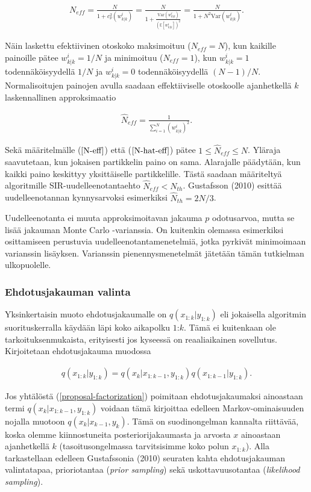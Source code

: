 \documentclass[
  12pt,
  a4paper, twoside]{book}
\begin{document}
\begin{align}\label{N-eff}
N_{eff}= \frac{N}{1+c_\nu^2(w^i_{k|k})} = \frac{N}{1+\frac{\text{Var}(w^i_{k|k})}{(\mathbb{E}[w^i_{k|k}])^2}} =\frac{N}{1+N^2\text{Var}(w^i_{k|k})}.
\end{align}

Näin laskettu efektiivinen otoskoko maksimoituu (\(N_{eff}=N\)), kun kaikille painoille pätee \(w^i_{k|k}=1/N\) ja minimoituu (\(N_{eff}=1\)), kun \(w^i_{k|k}=1\) todennäköisyydellä \(1/N\) ja \(w^i_{k|k}=0\) todennäköisyydellä \((N-1)/N\). Normalisoitujen painojen avulla saadaan effektiiviselle otoskoolle ajanhetkellä \(k\) laskennallinen approksimaatio

\begin{align}\label{N-hat-eff}
\hat{N}_{eff}=\frac{1}{\sum_{i=1}^N(w^i_{k|k})^2}.
\end{align}

Sekä määritelmälle (\(\ref{N-eff}\)) että (\(\ref{N-hat-eff}\)) pätee \(1 \leq \hat{N}_{eff} \leq N\). Yläraja saavutetaan, kun jokaisen partikkelin paino on sama. Alarajalle päädytään, kun kaikki paino keskittyy yksittäiselle partikkelille. Tästä saadaan määriteltyä algoritmille SIR-uudelleenotantaehto \(\hat{N}_{eff}< N_{th}\). Gustafsson (2010) \citep{gustafsson-2010} esittää uudelleenotannan kynnysarvoksi esimerkiksi \(\hat{N}_{th}=2N/3\).

Uudelleenotanta ei muuta approksimoitavan jakauma \(p\) odotusarvoa, mutta se lisää jakauman Monte Carlo -varianssia. On kuitenkin olemassa esimerkiksi osittamiseen perustuvia uudelleenotantamenetelmiä, jotka pyrkivät minimoimaan varianssin lisäyksen. Varianssin pienennysmenetelmät jätetään tämän tutkielman ulkopuolelle.

\subsubsection{Ehdotusjakauman valinta}

Yksinkertaisin muoto ehdotusjakaumalle on \(q(x_{1:k}|y_{1:k})\) eli jokaisella algoritmin suorituskerralla käydään läpi koko aikapolku \(1\):\(k\). Tämä ei kuitenkaan ole tarkoituksenmukaista, erityisesti jos kyseessä on reaaliaikainen sovellutus. Kirjoitetaan ehdotusjakauma muodossa

\begin{align}\label{proposal-factorization}
q(x_{1:k}|y_{1:k})=q(x_k|x_{1:k-1},y_{1:k})q(x_{1:k-1}|y_{1:k}).
\end{align}

Jos yhtälöstä (\ref{proposal-factorization}) poimitaan ehdotusjakaumaksi ainoastaan termi \(q(x_k|x_{1:k-1},y_{1:k})\) voidaan tämä kirjoittaa edelleen Markov-ominaisuuden nojalla muotoon \(q(x_k|x_{k-1},y_{k})\). Tämä on suodinongelman kannalta riittävää, koska olemme kiinnostuneita posteriorijakaumasta ja arvosta \(x\) ainoastaan ajanhetkellä \(k\) (tasoitusongelmassa tarvitsisimme koko polun \(x_{1:k}\)). Alla tarkastellaan edelleen Gustafssonia (2010) \citep{gustafsson-2010} seuraten kahta ehdotusjakauman valintatapaa, prioriotantaa (\emph{prior sampling}) sekä uskottavuusotantaa (\emph{likelihood sampling}).
\end{document}
